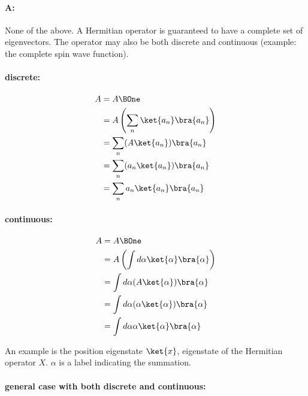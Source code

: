\paragraph{A:} None of the above.  A Hermitian operator is guaranteed to have a complete set of eigenvectors.  The operator may also be both discrete and continuous (example: the complete spin wave function).

\paragraph{discrete:}

\begin{equation}\label{eqn:lecture8makingSenseOfQM:1020}
\begin{aligned}
A &= A \BOne \\
&= A \left( \sum_n \ket{a_n} \bra{a_n} \right) \\
&= \sum_n (A \ket{a_n} )\bra{a_n} \\
&= \sum_n (a_n \ket{a_n}) \bra{a_n} \\
&= \sum_n a_n \ket{a_n} \bra{a_n}
\end{aligned}
\end{equation}

\paragraph{continuous:}

\begin{equation}\label{eqn:lecture8makingSenseOfQM:1040}
\begin{aligned}
A &= A \BOne \\
&= A \left( \int d\alpha \ket{\alpha} \bra{\alpha} \right) \\
&= \int d\alpha (A \ket{\alpha} )\bra{\alpha} \\
&= \int d\alpha (\alpha \ket{\alpha}) \bra{\alpha} \\
&= \int d\alpha \alpha \ket{\alpha} \bra{\alpha}
\end{aligned}
\end{equation}

An example is the position eigenstate \(\ket{x}\), eigenstate of the Hermitian operator \(X\).  \(\alpha\) is a label indicating the summation.

\paragraph{general case with both discrete and continuous:}

